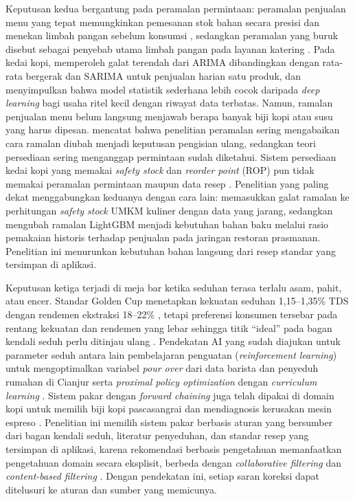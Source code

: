 Keputusan kedua bergantung pada peramalan permintaan: peramalan penjualan menu yang tepat memungkinkan pemesanan stok bahan secara presisi dan menekan limbah pangan sebelum konsumsi \citep*{posch2022bayesian}, sedangkan peramalan yang buruk disebut sebagai penyebab utama limbah pangan pada layanan katering \citep*{rodrigues2024machine}. Pada kedai kopi, \citet*{azzahra2025forecasting} memperoleh galat terendah dari ARIMA dibandingkan dengan rata-rata bergerak dan SARIMA untuk penjualan harian satu produk, dan \citet*{pattisealnno2026comparative} menyimpulkan bahwa model statistik sederhana lebih cocok daripada \textit{deep learning} bagi usaha ritel kecil dengan riwayat data terbatas. Namun, ramalan penjualan menu belum langsung menjawab berapa banyak biji kopi atau susu yang harus dipesan. \citet*{goltsos2022inventory} mencatat bahwa penelitian peramalan sering mengabaikan cara ramalan diubah menjadi keputusan pengisian ulang, sedangkan teori persediaan sering menganggap permintaan sudah diketahui. Sistem persediaan kedai kopi yang memakai \textit{safety stock} dan \textit{reorder point} (ROP) pun tidak memakai peramalan permintaan maupun data resep \citep*{taufiq2025implementation}. Penelitian yang paling dekat menggabungkan keduanya dengan cara lain: \citet*{lauren2026optimizing} memasukkan galat ramalan ke perhitungan \textit{safety stock} UMKM kuliner dengan data yang jarang, sedangkan \citet*{piewthongngam2026aienabled} mengubah ramalan LightGBM menjadi kebutuhan bahan baku melalui rasio pemakaian historis terhadap penjualan pada jaringan restoran prasmanan. Penelitian ini menurunkan kebutuhan bahan langsung dari resep standar yang tersimpan di aplikasi.

Keputusan ketiga terjadi di meja bar ketika seduhan terasa terlalu asam, pahit, atau encer. Standar Golden Cup menetapkan kekuatan seduhan 1,15--1,35\% TDS dengan rendemen ekstraksi 18--22\% \citep*{scaa2015golden}, tetapi preferensi konsumen tersebar pada rentang kekuatan dan rendemen yang lebar sehingga titik ``ideal'' pada bagan kendali seduh perlu ditinjau ulang \citep*{cotter2020consumer}. Pendekatan AI yang sudah diajukan untuk parameter seduh antara lain pembelajaran penguatan (\textit{reinforcement learning}) untuk mengoptimalkan variabel \textit{pour over} dari data barista dan penyeduh rumahan di Cianjur \citep*{bramantoro2025optimization} serta \textit{proximal policy optimization} dengan \textit{curriculum learning} \citep*{jeffery2025optimizing}. Sistem pakar dengan \textit{forward chaining} juga telah dipakai di domain kopi untuk memilih biji kopi pascasangrai \citep*{anggraeni2024sistem} dan mendiagnosis kerusakan mesin espreso \citep*{rizal2024sistem}. Penelitian ini memilih sistem pakar berbasis aturan yang bersumber dari bagan kendali seduh, literatur penyeduhan, dan standar resep yang tersimpan di aplikasi, karena rekomendasi berbasis pengetahuan memanfaatkan pengetahuan domain secara eksplisit, berbeda dengan \textit{collaborative filtering} dan \textit{content-based filtering} \citep{uta2024knowledgebased}. Dengan pendekatan ini, setiap saran koreksi dapat ditelusuri ke aturan dan sumber yang memicunya.

